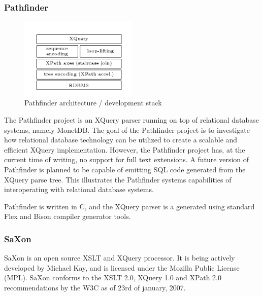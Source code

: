 \subsubsection{Pathfinder}
\begin{figure}[!h]
  \centering
    \includegraphics[width=0.5\textwidth]{img/pathfinder_architecture.png}
  \caption{Pathfinder architecture / development stack}
\end{figure}
The Pathfinder project is an XQuery parser running on top of relational database systems, namely MonetDB. The goal of the Pathfinder project is to investigate how relational database technology can be utilized to create a scalable and efficient XQuery implementation. However, the Pathfinder project has, at the current time of writing, no support for full text extensions. A future version of Pathfinder is planned to be capable of emitting SQL code generated from the XQuery parse tree. This illustrates the Pathfinder systems capabilities of interoperating with relational database systems.

Pathfinder is written in C, and the XQuery parser is a generated using standard Flex and Bison compiler generator tools.

\subsubsection{SaXon}
SaXon is an open source XSLT and XQuery processor. It is being actively developed by Michael Kay, and is licensed under the Mozilla Public License (MPL). SaXon conforms to the XSLT 2.0, XQuery 1.0 and XPath 2.0 recommendations by the W3C as of 23rd of january, 2007.

